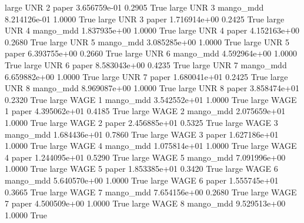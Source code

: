      large      UNR                 2                 paper 3.656759e-01      0.2905    True
     large      UNR                 3             mango_mdd 8.214126e-01      1.0000    True
     large      UNR                 3                 paper 1.716914e+00      0.2425    True
     large      UNR                 4             mango_mdd 1.837935e+00      1.0000    True
     large      UNR                 4                 paper 4.152163e+00      0.2680    True
     large      UNR                 5             mango_mdd 3.085285e+00      1.0000    True
     large      UNR                 5                 paper 6.393755e+00      0.2660    True
     large      UNR                 6             mango_mdd 4.592964e+00      1.0000    True
     large      UNR                 6                 paper 8.583043e+00      0.4235    True
     large      UNR                 7             mango_mdd 6.659882e+00      1.0000    True
     large      UNR                 7                 paper 1.680041e+01      0.2425    True
     large      UNR                 8             mango_mdd 8.969087e+00      1.0000    True
     large      UNR                 8                 paper 3.858474e+01      0.2320    True
     large     WAGE                 1             mango_mdd 3.542552e+01      1.0000    True
     large     WAGE                 1                 paper 4.395062e+01      0.4185    True
     large     WAGE                 2             mango_mdd 2.075659e+01      1.0000    True
     large     WAGE                 2                 paper 2.456885e+01      0.5325    True
     large     WAGE                 3             mango_mdd 1.684436e+01      0.7860    True
     large     WAGE                 3                 paper 1.627186e+01      1.0000    True
     large     WAGE                 4             mango_mdd 1.075814e+01      1.0000    True
     large     WAGE                 4                 paper 1.244095e+01      0.5290    True
     large     WAGE                 5             mango_mdd 7.091996e+00      1.0000    True
     large     WAGE                 5                 paper 1.853385e+01      0.3420    True
     large     WAGE                 6             mango_mdd 5.640570e+00      1.0000    True
     large     WAGE                 6                 paper 1.555745e+01      0.3665    True
     large     WAGE                 7             mango_mdd 7.654156e+00      0.2680    True
     large     WAGE                 7                 paper 4.500509e+00      1.0000    True
     large     WAGE                 8             mango_mdd 9.529513e+00      1.0000    True
